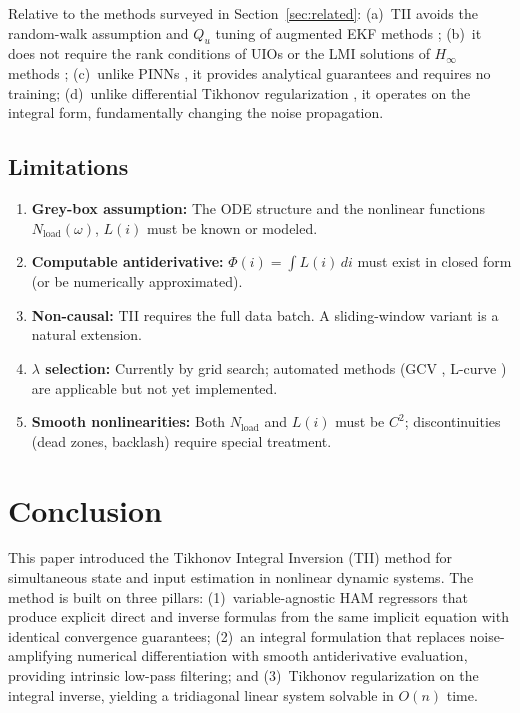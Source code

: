 \documentclass[lettersize,journal]{IEEEtran}
\begin{document}
Relative to the methods surveyed in Section~\ref{sec:related}: (a)~TII avoids the random-walk assumption and $Q_u$ tuning of augmented EKF methods \cite{gillijns2007, kitanidis1987}; (b)~it does not require the rank conditions of UIOs \cite{hou1998} or the LMI solutions of $H_\infty$ methods \cite{shi2016}; (c)~unlike PINNs \cite{raissi2019}, it provides analytical guarantees and requires no training; (d)~unlike differential Tikhonov regularization \cite{orjuela2019}, it operates on the integral form, fundamentally changing the noise propagation.

\subsection{Limitations}

\begin{enumerate}
    \item[(a)] \textbf{Grey-box assumption:} The ODE structure and the nonlinear functions $N_{\text{load}}(\omega)$, $L(i)$ must be known or modeled.
    \item[(b)] \textbf{Computable antiderivative:} $\Phi(i) = \int L(i)\,di$ must exist in closed form (or be numerically approximated).
    \item[(c)] \textbf{Non-causal:} TII requires the full data batch. A sliding-window variant is a natural extension.
    \item[(d)] \textbf{$\lambda$ selection:} Currently by grid search; automated methods (GCV \cite{golub1979}, L-curve \cite{hansen1992}) are applicable but not yet implemented.
    \item[(e)] \textbf{Smooth nonlinearities:} Both $N_{\text{load}}$ and $L(i)$ must be $C^2$; discontinuities (dead zones, backlash) require special treatment.
\end{enumerate}

\section{Conclusion}
\label{sec:conclusion}

This paper introduced the Tikhonov Integral Inversion (TII) method for simultaneous state and input estimation in nonlinear dynamic systems. The method is built on three pillars: (1)~variable-agnostic HAM regressors that produce explicit direct and inverse formulas from the same implicit equation with identical convergence guarantees; (2)~an integral formulation that replaces noise-amplifying numerical differentiation with smooth antiderivative evaluation, providing intrinsic low-pass filtering; and (3)~Tikhonov regularization on the integral inverse, yielding a tridiagonal linear system solvable in $O(n)$ time.
\end{document}
